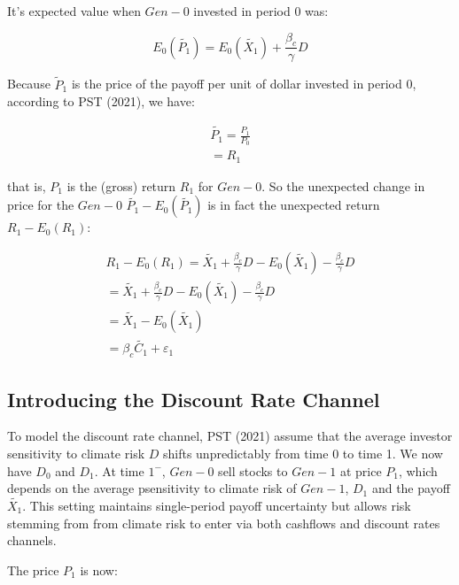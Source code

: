 It's expected value when $Gen-0$ invested in period 0 was:

\begin{equation}
    E_0(\tilde{P_1}) = E_0(\tilde{X_1}) + \frac{\beta_{c}}{\gamma}D
\end{equation}

Because $\tilde{P}_1$ is the price of the payoff 
per unit of dollar invested in period 0,
according to PST (2021), we have:

\begin{equation}
    \begin{aligned}
    \tilde{P_1} = \frac{P_1}{P_0} \\
    = R_1
    \end{aligned}
\end{equation}

that is, $P_1$ is the (gross) return
$R_1$ for $Gen-0$.
So the unexpected change in price 
for the $Gen-0$ $\tilde{P_1} - E_0(\tilde{P_1})$ is in fact
the unexpected return $R_1 - E_0(R_1)$:

\begin{equation}
    \begin{aligned}
    R_1 - E_0(R_1) = \tilde{X_1} + \frac{\beta_{c}}{\gamma}D - E_0(\tilde{X_1}) - \frac{\beta_{c}}{\gamma}D \\
    = \tilde{X_1} + \frac{\beta_{c}}{\gamma}D - E_0(\tilde{X_1}) - \frac{\beta_{c}}{\gamma}D \\
    = \tilde{X_1} - E_0(\tilde{X_1}) \\
    = \beta_{c} \tilde{C_1} + \varepsilon_1
    \end{aligned}
\end{equation}

\subsection{Introducing the Discount Rate Channel}

To model the discount rate channel, PST (2021)
assume that the average investor sensitivity to climate risk 
$D$ shifts unpredictably from time 0 
to time 1. We now have $D_0$ and $D_1$.
At time $1^{-}$, $Gen-0$ sell stocks 
to $Gen-1$ at price $P_1$, which depends 
on the average psensitivity to climate risk
of $Gen-1$, $D_1$ and the payoff $\tilde{X_1}$.
This setting maintains single-period 
payoff uncertainty but allows risk
stemming from from climate risk to enter 
via both cashflows and discount rates 
channels.

The price $P_1$ is now:

